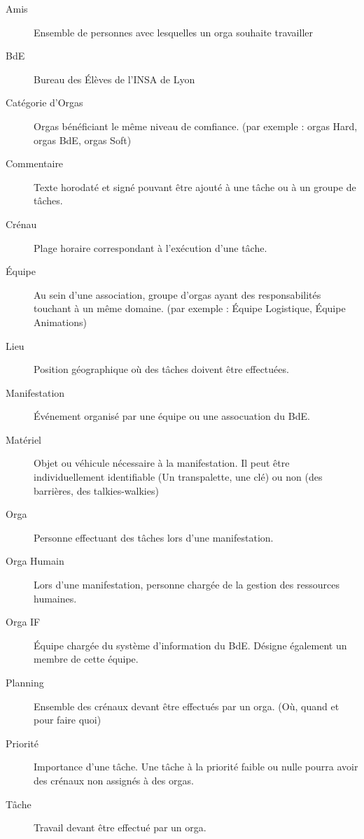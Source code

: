 \begin{description}
\item[Amis] Ensemble de personnes avec lesquelles un orga souhaite travailler 
\item[BdE] Bureau des Élèves de l'INSA de Lyon
\item[Catégorie d'Orgas] Orgas bénéficiant le même niveau de comfiance. (par exemple : orgas Hard, orgas BdE, orgas Soft)
\item[Commentaire] Texte horodaté et signé pouvant être ajouté à une tâche ou à un groupe de tâches.

\item[Crénau] Plage horaire correspondant à l'exécution d'une tâche.
\item[Équipe] Au sein d'une association, groupe d'orgas ayant des responsabilités touchant à un même domaine. (par exemple : Équipe Logistique, Équipe Animations)
\item[Lieu] Position géographique où des tâches doivent être effectuées.
\item[Manifestation] Événement organisé par une équipe ou une assocuation du BdE.
\item[Matériel] Objet ou véhicule nécessaire à la manifestation. Il peut être individuellement identifiable (Un transpalette, une clé) ou non (des barrières, des talkies-walkies)
\item[Orga] Personne effectuant des tâches lors d'une manifestation.
\item[Orga Humain] Lors d'une manifestation, personne chargée de la gestion des ressources humaines.
\item[Orga IF] Équipe chargée du système d'information du BdE. Désigne également un membre de cette équipe.
\item[Planning] Ensemble des crénaux devant être effectués par un orga. (Où, quand et pour faire quoi)
\item[Priorité] Importance d'une tâche. Une tâche à la priorité faible ou nulle pourra avoir des crénaux non assignés à des orgas.
\item[Tâche] Travail devant être effectué par un orga.


 \end{description}